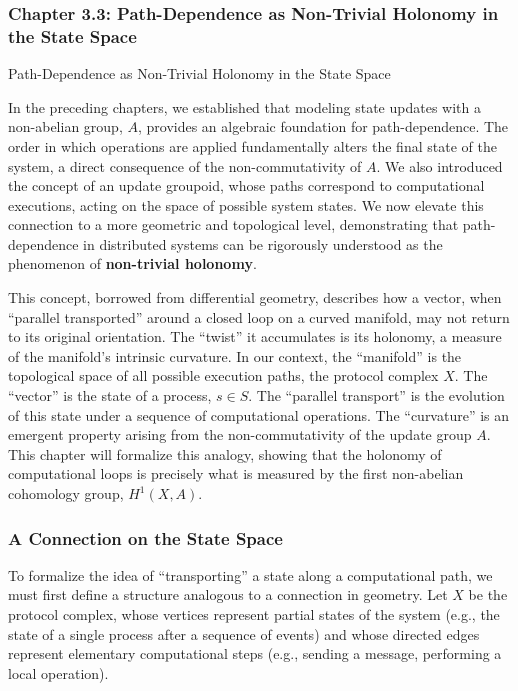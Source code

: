 \documentclass[
]{article}
\begin{document}
\subsubsection{Chapter 3.3: Path-Dependence as Non-Trivial Holonomy in
the State
Space}\label{chapter-3.3-path-dependence-as-non-trivial-holonomy-in-the-state-space}

\protect{}\label{chapter-3-3-Path-Dependence_as_Non-Trivial_Holonomy}{}

Path-Dependence as Non-Trivial Holonomy in the State Space

In the preceding chapters, we established that modeling state updates
with a non-abelian group, \(A\), provides an algebraic foundation for
path-dependence. The order in which operations are applied fundamentally
alters the final state of the system, a direct consequence of the
non-commutativity of \(A\). We also introduced the concept of an update
groupoid, whose paths correspond to computational executions, acting on
the space of possible system states. We now elevate this connection to a
more geometric and topological level, demonstrating that path-dependence
in distributed systems can be rigorously understood as the phenomenon of
\textbf{non-trivial holonomy}.

This concept, borrowed from differential geometry, describes how a
vector, when ``parallel transported'' around a closed loop on a curved
manifold, may not return to its original orientation. The ``twist'' it
accumulates is its holonomy, a measure of the manifold's intrinsic
curvature. In our context, the ``manifold'' is the topological space of
all possible execution paths, the protocol complex \(X\). The ``vector''
is the state of a process, \(s \in S\). The ``parallel transport'' is
the evolution of this state under a sequence of computational
operations. The ``curvature'' is an emergent property arising from the
non-commutativity of the update group \(A\). This chapter will formalize
this analogy, showing that the holonomy of computational loops is
precisely what is measured by the first non-abelian cohomology group,
\(H^1(X, A)\).

\subsubsection{A Connection on the State
Space}\label{a-connection-on-the-state-space}

To formalize the idea of ``transporting'' a state along a computational
path, we must first define a structure analogous to a connection in
geometry. Let \(X\) be the protocol complex, whose vertices represent
partial states of the system (e.g., the state of a single process after
a sequence of events) and whose directed edges represent elementary
computational steps (e.g., sending a message, performing a local
operation).
\end{document}
